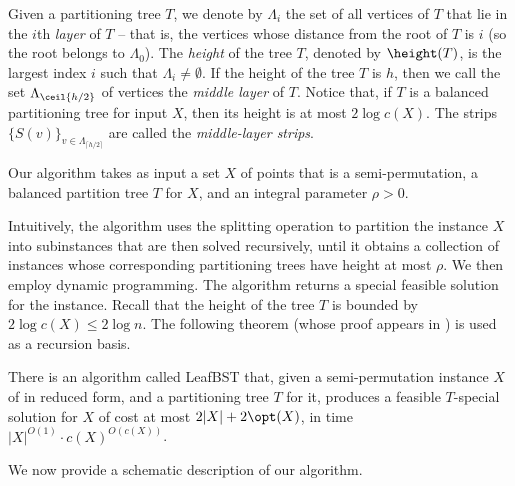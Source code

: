 \documentclass{toc}
\begin{document}
Given a partitioning tree $T$, we denote by $\Lambda_i$ the set of all vertices of $T$ that lie in the $i$th \emph{layer} of $T$ -- that is, the vertices whose distance from the root of $T$ is $i$ (so the root belongs to $\Lambda_0$). The \emph{height} of the tree $T$, denoted by $\height(T)$, is the largest index $i$ such that $\Lambda_i\neq \emptyset$. If the height of the tree $T$ is $h$, then we call the set  $\Lambda_{\ceil{h/2}}$ of vertices the \emph{middle layer} of $T$. Notice that, if $T$ is a balanced partitioning tree for input $X$, then its height is at most $2 \log c(X)$. The strips $\{S(v)\}_{v \in \Lambda_{\lceil h/2 \rceil}}$ are called the \textit{middle-layer strips}. 


Our algorithm takes as input a set $X$ of points that is a semi-permutation, a balanced partition tree $T$ for $X$,  and an integral parameter $\rho>0$. 
%

Intuitively, the algorithm uses the splitting operation to partition the instance $X$ into subinstances that are then solved recursively, until it obtains a collection of instances whose corresponding partitioning trees have height at most $\rho$. We then  employ dynamic programming. 
The algorithm returns a special feasible solution for the instance. 
Recall that the height of the tree $T$ is bounded by $2\log c(X)\leq 2\log n$. 
%
%
The following theorem (whose proof appears in ) is used as a recursion basis. 

\begin{theorem}
	\label{thm: leaf problem1} 
	There is an algorithm called {\sc LeafBST} that, given a semi-permutation instance $X$ of \minsat in reduced form, and a partitioning tree $T$ for it, produces a feasible $T$-special solution for $X$ of cost at most $2 |X| + 2\opt(X)$, in time $|X|^{O(1)} \cdot c(X)^{O(c(X))}$.
\end{theorem}


%
%
%
%


We now provide a schematic description of our algorithm. 
%



%
\end{document}
